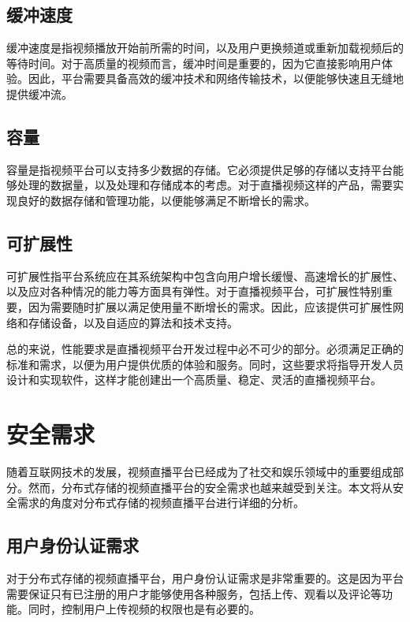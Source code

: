     \subsection{缓冲速度}
    
    缓冲速度是指视频播放开始前所需的时间，以及用户更换频道或重新加载视频后的等待时间。对于高质量的视频而言，缓冲时间是重要的，因为它直接影响用户体验。因此，平台需要具备高效的缓冲技术和网络传输技术，以便能够快速且无缝地提供缓冲流。
    
    \subsection{容量}
    
    容量是指视频平台可以支持多少数据的存储。它必须提供足够的存储以支持平台能够处理的数据量，以及处理和存储成本的考虑。对于直播视频这样的产品，需要实现良好的数据存储和管理功能，以便能够满足不断增长的需求。
    
    \subsection{可扩展性}
    
    可扩展性指平台系统应在其系统架构中包含向用户增长缓慢、高速增长的扩展性、以及应对各种情况的能力等方面具有弹性。对于直播视频平台，可扩展性特别重要，因为需要随时扩展以满足使用量不断增长的需求。因此，应该提供可扩展性网络和存储设备，以及自适应的算法和技术支持。
    
    总的来说，性能要求是直播视频平台开发过程中必不可少的部分。必须满足正确的标准和需求，以便为用户提供优质的体验和服务。同时，这些要求将指导开发人员设计和实现软件，这样才能创建出一个高质量、稳定、灵活的直播视频平台。

\section{安全需求}

随着互联网技术的发展，视频直播平台已经成为了社交和娱乐领域中的重要组成部分。然而，分布式存储的视频直播平台的安全需求也越来越受到关注。本文将从安全需求的角度对分布式存储的视频直播平台进行详细的分析。

    \subsection{用户身份认证需求}
    
    对于分布式存储的视频直播平台，用户身份认证需求是非常重要的。这是因为平台需要保证只有已注册的用户才能够使用各种服务，包括上传、观看以及评论等功能。同时，控制用户上传视频的权限也是有必要的。
    
